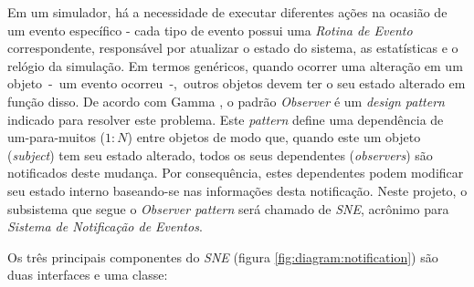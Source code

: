 Em um simulador, há a necessidade de executar diferentes ações na ocasião de um
evento específico - cada tipo de evento possui uma \textit{Rotina de Evento}
correspondente, responsável por atualizar o estado do sistema, as estatísticas e
o relógio da simulação. Em termos genéricos, quando ocorrer uma alteração em um
objeto~-~um evento ocorreu~-,~outros objetos devem ter o seu estado alterado em
função disso. De acordo com Gamma \cite{Gamma:1995:DPE:186897}, o padrão
\textit{Observer} é um \textit{design pattern} indicado para resolver este
problema. Este \textit{pattern} define uma dependência de um-para-muitos ($1:N$)
entre objetos de modo que, quando este um objeto (\textit{subject}) tem seu
estado alterado, todos os seus dependentes (\textit{observers}) são notificados
deste mudança. Por consequência, estes dependentes podem modificar seu estado
interno baseando-se nas informações desta notificação. Neste projeto, o
subsistema que segue o \textit{Observer pattern} será chamado de \textit{SNE},
acrônimo para \textit{Sistema de Notificação de Eventos}.

Os três principais componentes do \textit{SNE} (figura
\ref{fig:diagram:notification}) são duas interfaces e uma classe:

